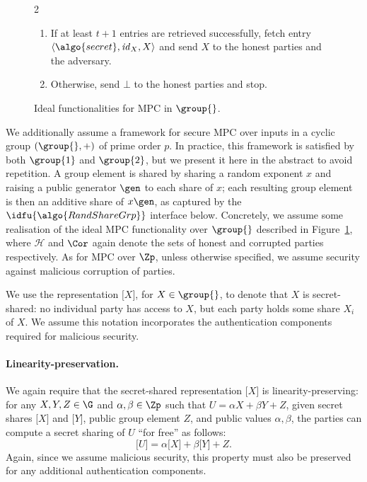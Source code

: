\begin{figure}
\begin{minipage}{1.1\textwidth}
\begin{framed}
\begin{multicols}{2}
\begin{enumerate}
            \item If at least $t+1$ entries are retrieved successfully, fetch
              entry $\langle \algo{secret}, \mathit{id}_{{X}}, {{X}}\rangle$
              and send ${X}$ to the honest parties and the adversary.

            \item Otherwise, send $\bot$ to the honest parties and stop.

          \end{enumerate}

        \end{multicols}

      \end{framed}

    \end{minipage} \caption{Ideal functionalities for MPC in $\group{}$.}
  \label{fig:ideal-func-group} \end{figure}

  We additionally assume a framework for secure MPC over inputs in a cyclic
  group $(\group{},+)$ of prime order $p$. In practice, this framework is
  satisfied by both $\group{1}$ and $\group{2}$, but we present it here in the
  abstract to avoid repetition. A group element is shared by sharing a random
  exponent $x$ and raising a public generator $\gen$ to each share of $x$; each
  resulting group element is then an additive share of $x\gen$, as captured by
  the $\idfu{\algo{RandShareGrp}}$ interface below. Concretely, we assume some
  realisation of the ideal MPC functionality over $\group{}$ described in
  Figure~\ref{fig:ideal-func-group}, where $\mathcal{H}$ and $\Cor$ again
  denote the sets of honest and corrupted parties respectively. As for MPC over
  $\Zp$, unless otherwise specified, we assume security against malicious
  corruption of parties.

  We use the representation $\lbrack X\rbrack $, for $X\in \group{}$, to denote
  that $X$ is secret-shared: no individual party has access to $X$, but each
  party holds some share $X_i$ of $X$. We assume this notation incorporates the
  authentication components required for malicious security.

  \paragraph{Linearity-preservation.} We again require that the secret-shared
  representation $\lbrack X\rbrack $ is linearity-preserving: for any $X,Y,Z\in
  \G$ and $\alpha,\beta\in \Zp$ such that $U = \alpha X + \beta Y + Z$, given
  secret shares $\lbrack X\rbrack $ and $\lbrack Y \rbrack $, public group
  element $Z$, and public values $\alpha,\beta$, the parties can compute a
  secret sharing of $U$ ``for free'' as follows: \[\lbrack U\rbrack =
    \alpha\lbrack X\rbrack + \beta \lbrack Y \rbrack + Z.\] Again, since we
    assume malicious security, this property must also be preserved for any
    additional authentication components.

